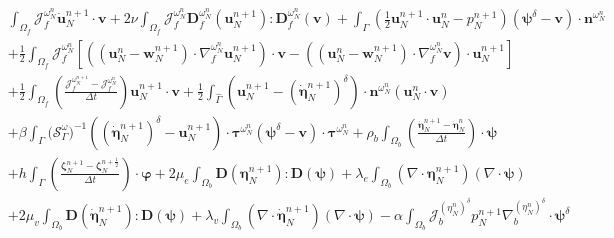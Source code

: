 \documentclass[10pt,a4paper]{amsart}
\newcommand{\bd}{\boldsymbol}
\begin{document}
\begin{equation}\label{weakBiot1}
\begin{aligned}
&\int_{\Omega_{f}} \mathcal{J}^{\omega^{n}_{N}}_{f} \dot{\bd{u}}^{n + 1}_{N} \cdot \boldsymbol{v} 
+ 2\nu \int_{\Omega_{f}} \mathcal{J}^{\omega^{n}_{N}}_{f} \bd{D}^{\omega^{n}_{N}}_{f}(\boldsymbol{u}^{n + 1}_{N}) : \bd{D}^{\omega^{n}_{N}}_{f}(\boldsymbol{v}) + \int_{\Gamma} \left(\frac{1}{2}\boldsymbol{u}^{n + 1}_{N} \cdot \boldsymbol{u}^{n}_{N} - p^{n + 1}_{N}\right)(\boldsymbol{\psi}^{\delta} - \boldsymbol{v})\cdot \boldsymbol{n}^{\omega^{n}_{N}} 
\\
&+ \frac{1}{2} \int_{\Omega_{f}} \mathcal{J}^{\omega^{n}_{N}}_{f} \left[\left(\left(\boldsymbol{u}^{n}_{N} - \bd{w}^{n + 1}_{N}\right) \cdot \nabla^{\omega^{n}_{N}}_{f} \boldsymbol{u}^{n + 1}_{N}\right) \cdot \boldsymbol{v} - \left(\left(\boldsymbol{u}^{n}_{N} - \bd{w}^{n + 1}_{N}\right) \cdot \nabla^{\omega^{n}_{N}}_{f} \boldsymbol{v}\right) \cdot \boldsymbol{u}^{n + 1}_{N}\right] 
\\
&+ \frac{1}{2} \int_{\Omega_{f}} \left(\frac{\mathcal{J}^{\omega^{n + 1}_{N}}_{f} - \mathcal{J}^{\omega^{n}_{N}}_{f}}{\Delta t}\right) \bd{u}^{n + 1}_{N} \cdot \boldsymbol{v} + \frac{1}{2} \int_{\hat{\Gamma}} \left(\boldsymbol{u}^{n + 1}_{N} - \left(\dot{\bd{\eta}}^{n + 1}_{N}\right)^{\delta}\right) \cdot \boldsymbol{n}^{\omega^{n}_{N}} (\boldsymbol{u}^{n}_{N} \cdot \boldsymbol{v}) 
\\
&+ \beta \int_{\Gamma} \Big(\mathcal{S}^{\omega}_{\Gamma}\Big)^{-1} \left(\left(\boldsymbol{\dot{\eta}}^{n + 1}_{N}\right)^{\delta} - \boldsymbol{u}^{n + 1}_{N}\right) \cdot \boldsymbol{\tau}^{\omega^{n}_{N}} (\boldsymbol{\psi}^{\delta} - \boldsymbol{v}) \cdot \boldsymbol{\tau}^{\omega^{n}_{N}} + \rho_{b} \int_{\Omega_{b}} \left(\frac{\boldsymbol{\dot{\eta}}^{n + 1}_{N} - \boldsymbol{\dot{\eta}}^{n}_{N}}{\Delta t}\right) \cdot \boldsymbol{\psi} 
\\
&+ h \int_{\Gamma} \left(\frac{\bd{\zeta}^{n + 1}_{N} - \bd{\zeta}^{n + \frac{1}{2}}_{N}}{\Delta t}\right) \cdot \bd{\varphi} + 2\mu_{e} \int_{\Omega_{b}} \boldsymbol{D}(\boldsymbol{\eta}^{n + 1}_{N}) : \boldsymbol{D}(\boldsymbol{\psi}) + \lambda_{e} \int_{\Omega_{b}} (\nabla \cdot \boldsymbol{\eta}^{n + 1}_{N})(\nabla \cdot \boldsymbol{\psi}) 
\\
&+ 2\mu_{v} \int_{\Omega_{b}} \bd{D}(\dot{\bd{\eta}}^{n + 1}_{N}) : \bd{D}(\bd{\psi}) + \lambda_{v} \int_{\Omega_{b}} (\nabla \cdot \dot{\bd{\eta}}^{n + 1}_{N}) (\nabla \cdot \bd{\psi}) - \alpha \int_{\Omega_{b}} \mathcal{J}^{(\eta^{n}_{N})^{\delta}}_{b} p^{n + 1}_{N} \nabla^{(\eta^{n}_{N})^{\delta}}_{b} \cdot \boldsymbol{\psi}^{\delta} 

\end{aligned}
\end{equation}
\end{document}
